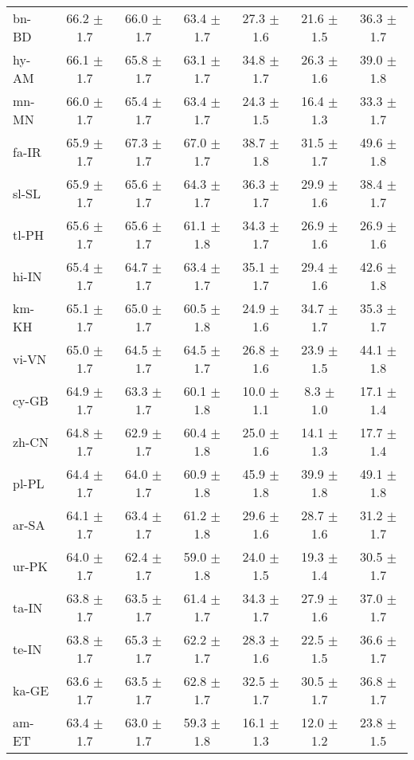 \documentclass[11pt]{article}
\begin{document}
\begin{table*}[]
{\begin{tabular}{lcccccc}
bn-BD & 66.2 $\pm$ 1.7 & 66.0 $\pm$ 1.7 & 63.4 $\pm$ 1.7 & 27.3 $\pm$ 1.6 & 21.6 $\pm$ 1.5 & 36.3 $\pm$ 1.7 \\
hy-AM & 66.1 $\pm$ 1.7 & 65.8 $\pm$ 1.7 & 63.1 $\pm$ 1.7 & 34.8 $\pm$ 1.7 & 26.3 $\pm$ 1.6 & 39.0 $\pm$ 1.8 \\
mn-MN & 66.0 $\pm$ 1.7 & 65.4 $\pm$ 1.7 & 63.4 $\pm$ 1.7 & 24.3 $\pm$ 1.5 & 16.4 $\pm$ 1.3 & 33.3 $\pm$ 1.7 \\
fa-IR & 65.9 $\pm$ 1.7 & 67.3 $\pm$ 1.7 & 67.0 $\pm$ 1.7 & 38.7 $\pm$ 1.8 & 31.5 $\pm$ 1.7 & 49.6 $\pm$ 1.8 \\
sl-SL & 65.9 $\pm$ 1.7 & 65.6 $\pm$ 1.7 & 64.3 $\pm$ 1.7 & 36.3 $\pm$ 1.7 & 29.9 $\pm$ 1.6 & 38.4 $\pm$ 1.7 \\
tl-PH & 65.6 $\pm$ 1.7 & 65.6 $\pm$ 1.7 & 61.1 $\pm$ 1.8 & 34.3 $\pm$ 1.7 & 26.9 $\pm$ 1.6 & 26.9 $\pm$ 1.6 \\
hi-IN & 65.4 $\pm$ 1.7 & 64.7 $\pm$ 1.7 & 63.4 $\pm$ 1.7 & 35.1 $\pm$ 1.7 & 29.4 $\pm$ 1.6 & 42.6 $\pm$ 1.8 \\
km-KH & 65.1 $\pm$ 1.7 & 65.0 $\pm$ 1.7 & 60.5 $\pm$ 1.8 & 24.9 $\pm$ 1.6 & 34.7 $\pm$ 1.7 & 35.3 $\pm$ 1.7 \\
vi-VN & 65.0 $\pm$ 1.7 & 64.5 $\pm$ 1.7 & 64.5 $\pm$ 1.7 & 26.8 $\pm$ 1.6 & 23.9 $\pm$ 1.5 & 44.1 $\pm$ 1.8 \\
cy-GB & 64.9 $\pm$ 1.7 & 63.3 $\pm$ 1.7 & 60.1 $\pm$ 1.8 & 10.0 $\pm$ 1.1 & 8.3 $\pm$ 1.0 & 17.1 $\pm$ 1.4 \\
zh-CN & 64.8 $\pm$ 1.7 & 62.9 $\pm$ 1.7 & 60.4 $\pm$ 1.8 & 25.0 $\pm$ 1.6 & 14.1 $\pm$ 1.3 & 17.7 $\pm$ 1.4 \\
pl-PL & 64.4 $\pm$ 1.7 & 64.0 $\pm$ 1.7 & 60.9 $\pm$ 1.8 & 45.9 $\pm$ 1.8 & 39.9 $\pm$ 1.8 & 49.1 $\pm$ 1.8 \\
ar-SA & 64.1 $\pm$ 1.7 & 63.4 $\pm$ 1.7 & 61.2 $\pm$ 1.8 & 29.6 $\pm$ 1.6 & 28.7 $\pm$ 1.6 & 31.2 $\pm$ 1.7 \\
ur-PK & 64.0 $\pm$ 1.7 & 62.4 $\pm$ 1.7 & 59.0 $\pm$ 1.8 & 24.0 $\pm$ 1.5 & 19.3 $\pm$ 1.4 & 30.5 $\pm$ 1.7 \\
ta-IN & 63.8 $\pm$ 1.7 & 63.5 $\pm$ 1.7 & 61.4 $\pm$ 1.7 & 34.3 $\pm$ 1.7 & 27.9 $\pm$ 1.6 & 37.0 $\pm$ 1.7 \\
te-IN & 63.8 $\pm$ 1.7 & 65.3 $\pm$ 1.7 & 62.2 $\pm$ 1.7 & 28.3 $\pm$ 1.6 & 22.5 $\pm$ 1.5 & 36.6 $\pm$ 1.7 \\
ka-GE & 63.6 $\pm$ 1.7 & 63.5 $\pm$ 1.7 & 62.8 $\pm$ 1.7 & 32.5 $\pm$ 1.7 & 30.5 $\pm$ 1.7 & 36.8 $\pm$ 1.7 \\
am-ET & 63.4 $\pm$ 1.7 & 63.0 $\pm$ 1.7 & 59.3 $\pm$ 1.8 & 16.1 $\pm$ 1.3 & 12.0 $\pm$ 1.2 & 23.8 $\pm$ 1.5 \\

\end{tabular}}
\end{table*}
\end{document}
